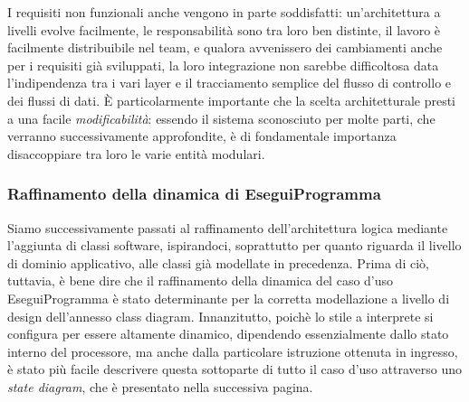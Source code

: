 \documentclass[11pt]{article}
\begin{document}
I requisiti non funzionali anche vengono in parte soddisfatti: un'architettura a livelli evolve facilmente, le responsabilità sono tra loro ben distinte, il lavoro è facilmente distribuibile nel team, e qualora avvenissero dei cambiamenti anche per i requisiti già sviluppati, la loro integrazione non sarebbe difficoltosa data l'indipendenza tra i vari layer e il tracciamento semplice del flusso di controllo e dei flussi di dati. È particolarmente importante che la scelta architetturale presti a una facile \emph{modificabilità}: essendo il sistema sconosciuto per molte parti, che verranno successivamente approfondite, è di fondamentale importanza disaccoppiare tra loro le varie entità modulari.

\subsubsection{Raffinamento della dinamica di EseguiProgramma}
Siamo successivamente passati al raffinamento dell'architettura logica mediante l'aggiunta di classi software, ispirandoci, soprattutto per quanto riguarda il livello di dominio applicativo, alle classi già modellate in precedenza. Prima di ciò, tuttavia, è bene dire che il raffinamento della dinamica del caso d'uso EseguiProgramma è stato determinante per la corretta modellazione a livello di design dell'annesso class diagram. Innanzitutto, poichè lo stile a interprete si configura per essere altamente dinamico, dipendendo essenzialmente dallo stato interno del processore, ma anche dalla particolare istruzione ottenuta in ingresso, è stato più facile descrivere questa sottoparte di tutto il caso d'uso attraverso uno \emph{state diagram}, che è presentato nella successiva pagina.
\end{document}
